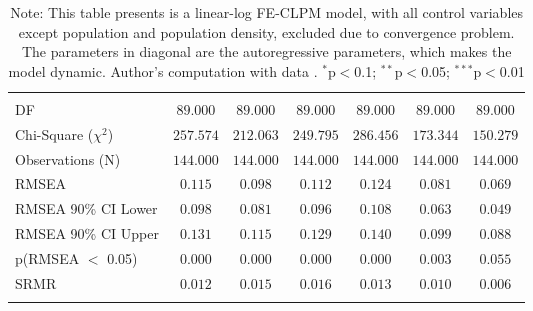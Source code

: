 \begin{longtable}{@{\extracolsep{-3pt}}lcccccc}
\hline \\[-1.1ex]
DF                              & $89.000$       & $89.000$      & $89.000$      & $89.000$      & $89.000$      & $89.000$      \\
Chi-Square ($\chi^2$)                           & $257.574$      & $212.063$     & $249.795$     & $286.456$     & $173.344$     & $150.279$     \\
Observations (N)                               & $144.000$      & $144.000$     & $144.000$     & $144.000$     & $144.000$     & $144.000$     \\
RMSEA                           & $0.115$        & $0.098$       & $0.112$       & $0.124$       & $0.081$       & $0.069$       \\
RMSEA  90\% CI Lower  & $0.098$       & $0.081$       & $0.096$       & $0.108$       & $0.063$       & $0.049$       \\
RMSEA  90\% CI Upper                  & $0.131$        & $0.115$       & $0.129$       & $0.140$       & $0.099$       & $0.088$       \\
p(RMSEA $<$ 0.05)                    & $0.000$        & $0.000$       & $0.000$       & $0.000$       & $0.003$       & $0.055$       \\
SRMR                            & $0.012$        & $0.015$       & $0.016$       & $0.013$       & $0.010$       & $0.006$       \\
\hline
\caption*{\scriptsize{Note: This table presents is a linear-log FE-CLPM model, with all control variables except population and population density, excluded due to convergence problem. The parameters in diagonal are the autoregressive parameters, which makes the model dynamic. Author's computation with data \textcite{wdi_world_2023, unsdg_sustainable_2023}. $^{*}$p$<$0.1; $^{**}$p$<$0.05; $^{***}$p$<$0.01}}
\label{table:DPM_RQ1}
\end{longtable}

%